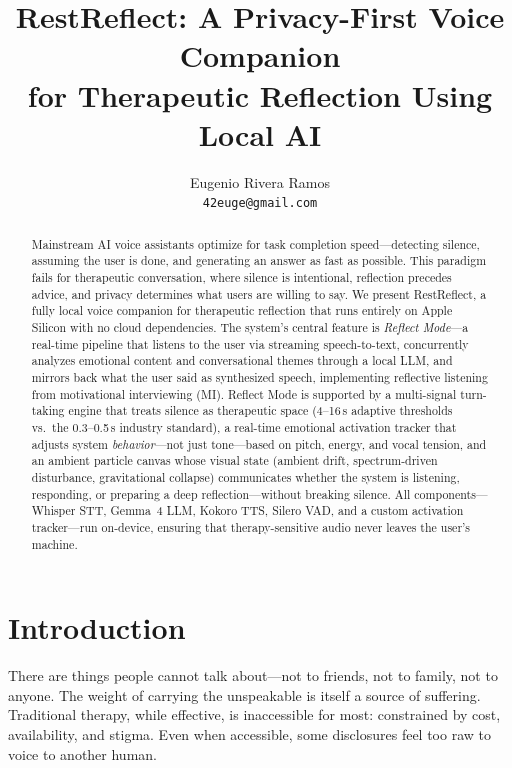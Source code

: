\documentclass{article}
\title{RestReflect: A Privacy-First Voice Companion\\for Therapeutic Reflection Using Local AI}
\author{
  Eugenio Rivera Ramos \\
  \texttt{42euge@gmail.com}
}
\begin{document}
\maketitle

\begin{abstract}
Mainstream AI voice assistants optimize for task completion speed---detecting silence, assuming the user is done, and generating an answer as fast as possible. This paradigm fails for therapeutic conversation, where silence is intentional, reflection precedes advice, and privacy determines what users are willing to say. We present RestReflect, a fully local voice companion for therapeutic reflection that runs entirely on Apple Silicon with no cloud dependencies. The system's central feature is \emph{Reflect Mode}---a real-time pipeline that listens to the user via streaming speech-to-text, concurrently analyzes emotional content and conversational themes through a local LLM, and mirrors back what the user said as synthesized speech, implementing reflective listening from motivational interviewing (MI). Reflect Mode is supported by a multi-signal turn-taking engine that treats silence as therapeutic space (4--16\,s adaptive thresholds vs.\ the 0.3--0.5\,s industry standard), a real-time emotional activation tracker that adjusts system \emph{behavior}---not just tone---based on pitch, energy, and vocal tension, and an ambient particle canvas whose visual state (ambient drift, spectrum-driven disturbance, gravitational collapse) communicates whether the system is listening, responding, or preparing a deep reflection---without breaking silence. All components---Whisper STT, Gemma~4 LLM, Kokoro TTS, Silero VAD, and a custom activation tracker---run on-device, ensuring that therapy-sensitive audio never leaves the user's machine.
\end{abstract}

\section{Introduction}

There are things people cannot talk about---not to friends, not to family, not to anyone. The weight of carrying the unspeakable is itself a source of suffering. Traditional therapy, while effective, is inaccessible for most: constrained by cost, availability, and stigma. Even when accessible, some disclosures feel too raw to voice to another human.
\end{document}
